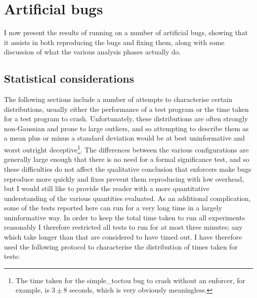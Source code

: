 \section{Artificial bugs}

I now present the results of running {\implementation} on a number of
artificial bugs, showing that it assists in both reproducing the bugs
and fixing them, along with some discussion of what the various
analysis phases actually do.

\subsection{Statistical considerations}

The following sections include a number of attempts to characterise
certain distributions, usually either the performance of a test
program or the time taken for a test program to crash.  Unfortunately,
these distributions are often strongly non-Gaussian and prone to large
outliers, and so attempting to describe them as a mean plus or minus a
standard deviation would be at best uninformative and worst outright
deceptive\footnote{The time taken for the simple\_toctou bug to crash
  without an enforcer, for example, is $3 \pm 8$ seconds, which is
  very obviously meaningless.}.  The differences between the various
configurations are generally large enough that there is no need for a
formal significance test, and so these difficulties do not affect the
qualitative conclusion that enforcers make bugs reproduce more quickly
and fixes prevent them reproducing with low overhead, but I would
still like to provide the reader with a more quantitative
understanding of the various quantities evaluated.  As an additional
complication, some of the tests reported here can run for a very long
time in a largely uninformative way.  In order to keep the total time
taken to run all experiments reasonably I therefore restricted all
tests to run for at most three minutes; any which take longer than
that are considered to have timed out.  I have therefore used the
following protocol to characterise the distribution of times taken for
tests:

